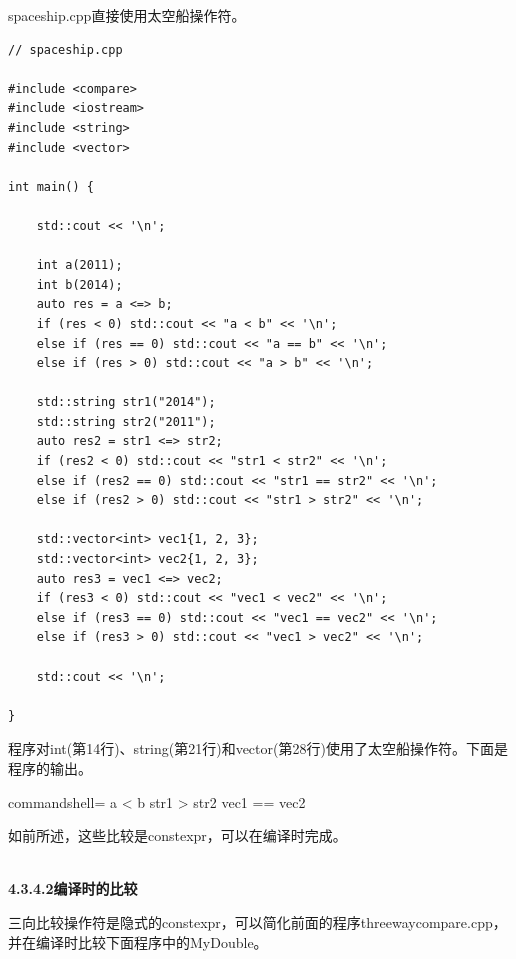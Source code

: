spaceship.cpp直接使用太空船操作符。

\begin{lstlisting}[style=styleCXX]
// spaceship.cpp

#include <compare>
#include <iostream>
#include <string>
#include <vector>

int main() {
	
	std::cout << '\n';
	
	int a(2011);
	int b(2014);
	auto res = a <=> b;
	if (res < 0) std::cout << "a < b" << '\n';
	else if (res == 0) std::cout << "a == b" << '\n';
	else if (res > 0) std::cout << "a > b" << '\n';
	
	std::string str1("2014");
	std::string str2("2011");
	auto res2 = str1 <=> str2;
	if (res2 < 0) std::cout << "str1 < str2" << '\n';
	else if (res2 == 0) std::cout << "str1 == str2" << '\n';
	else if (res2 > 0) std::cout << "str1 > str2" << '\n';
	
	std::vector<int> vec1{1, 2, 3};
	std::vector<int> vec2{1, 2, 3};
	auto res3 = vec1 <=> vec2;
	if (res3 < 0) std::cout << "vec1 < vec2" << '\n';
	else if (res3 == 0) std::cout << "vec1 == vec2" << '\n';
	else if (res3 > 0) std::cout << "vec1 > vec2" << '\n';
	
	std::cout << '\n';

}
\end{lstlisting}

程序对int(第14行)、string(第21行)和vector(第28行)使用了太空船操作符。下面是程序的输出。

\begin{tcblisting}{commandshell={}}
a < b
str1 > str2
vec1 == vec2
\end{tcblisting}

如前所述，这些比较是constexpr，可以在编译时完成。

\hspace*{\fill} \\ %
\noindent
\textbf{4.3.4.2\hspace{0.2cm}编译时的比较}

三向比较操作符是隐式的constexpr，可以简化前面的程序threewaycompare.cpp，并在编译时比较下面程序中的MyDouble。

